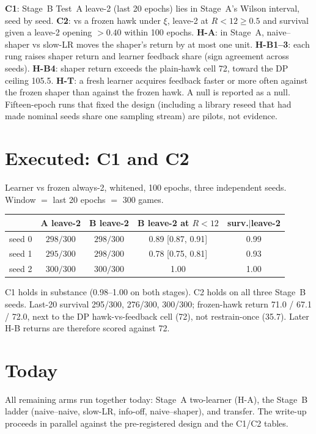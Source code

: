 \documentclass[11pt,a4paper]{article}
\begin{document}
\textbf{C1}: Stage~B Test~A leave-2 (last 20 epochs) lies in Stage~A's Wilson interval, seed by seed.
\textbf{C2}: vs a frozen hawk under \(\xi\), leave-2 at \(R<12\ge 0.5\) and survival given a leave-2 opening \(>0.40\) within 100 epochs.
\textbf{H-A}: in Stage~A, naive--shaper vs slow-LR moves the shaper's return by at most one unit.
\textbf{H-B1--3}: each rung raises shaper return and learner feedback share (sign agreement across seeds).
\textbf{H-B4}: shaper return exceeds the plain-hawk cell 72, toward the DP ceiling 105.5.
\textbf{H-T}: a fresh learner acquires feedback faster or more often against the frozen shaper than against the frozen hawk.
A null is reported as a null.
Fifteen-epoch runs that fixed the design (including a library reseed that had made nominal seeds share one sampling stream) are pilots, not evidence.

\section*{Executed: C1 and C2}
Learner vs frozen always-2, whitened, 100 epochs, three independent seeds.
Window \(=\) last 20 epochs \(=\) 300 games.

\begin{center}
\small\vspace{-0.3em}
\begin{tabular}{@{}lcccc@{}}
\toprule
 & A leave-2 & B leave-2 & B leave-2 at \(R<12\) & surv.\(|\)leave-2 \\
\midrule
seed 0 & \(298/300\) & \(298/300\) & 0.89 [0.87, 0.91] & 0.99 \\
seed 1 & \(295/300\) & \(298/300\) & 0.78 [0.75, 0.81] & 0.93 \\
seed 2 & \(300/300\) & \(300/300\) & 1.00 & 1.00 \\
\bottomrule
\end{tabular}
\end{center}

C1 holds in substance (0.98--1.00 on both stages).
C2 holds on all three Stage~B seeds.
Last-20 survival 295/300, 276/300, 300/300; frozen-hawk return 71.0 / 67.1 / 72.0, next to the DP hawk-vs-feedback cell (72), not restrain-once (35.7).
Later H-B returns are therefore scored against 72.

\section*{Today}
All remaining arms run together today: Stage~A two-learner (H-A), the Stage~B ladder (naive--naive, slow-LR, info-off, naive--shaper), and transfer.
The write-up proceeds in parallel against the pre-registered design and the C1/C2 tables.
\end{document}
